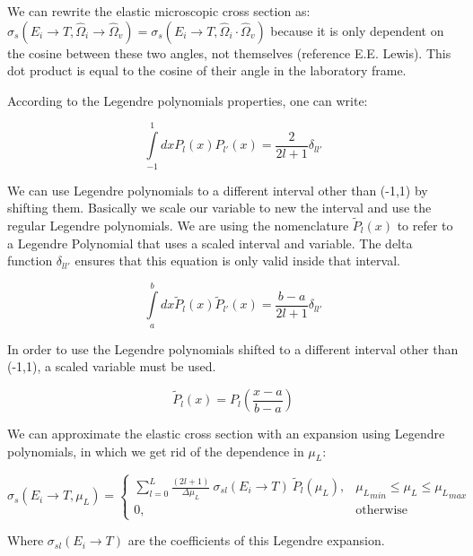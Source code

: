 \documentclass[review]{elsarticle}
\begin{document}
We can rewrite the elastic microscopic cross section as: $\sigma_{s}(E_i \rightarrow T, \hat{\Omega}_i \rightarrow \hat{\Omega}_v) = \sigma_{s}(E_i \rightarrow T, \hat{\Omega}_i \cdot \hat{\Omega}_v)$ because it is only dependent on the cosine between these two angles, not themselves (reference E.E. Lewis). This dot product is equal to the cosine of their angle in the laboratory frame. 

According to the Legendre polynomials properties, one can write:

\begin{equation}
	\int\limits_{-1}^1 dx P_l(x) P_{l'}(x) = \frac{2}{2l +1} \delta_{ll'}
\end{equation}

We can use Legendre polynomials to a different interval other than (-1,1) by shifting them. Basically we scale our variable to new the interval and use the regular Legendre polynomials. We are using the nomenclature $\tilde P_l(x)$ to refer to a Legendre Polynomial that uses a scaled interval and variable. The delta function $\delta_{ll'}$ ensures that this equation is only valid inside that interval.

\begin{equation}
	\int\limits_{a}^{b} dx \tilde P_l(x) \tilde P_{l'}(x) = \frac{b - a}{2l +1} \delta_{ll'}
\end{equation}

In order to use the Legendre polynomials shifted to a different interval other than (-1,1), a scaled variable must be used. 

\begin{equation}
	\tilde P_l (x) = P_l \left( \frac{x - a}{b - a}\right)
\end{equation}

We can approximate the elastic cross section with an expansion using Legendre polynomials, in which we get rid of the dependence in $\mu_L$:

\begin{equation}
	\sigma_{s}(E_i \rightarrow T, \mu_L) = 
	\begin{cases}
    		\sum\limits_{l=0}^{L} \frac{(2l +1)}{\Delta \mu_L} \  \sigma_{sl} (E_i \rightarrow T) \ \tilde P_l (\mu_L), & {\mu_L}_{min} \leq {\mu_L} \leq {\mu_L}_{max} \\
    		0,              & \text{otherwise}
\end{cases}
\label{eq:xs_expansion}
\end{equation}

Where $\sigma_{sl} (E_i \rightarrow T)$ are the coefficients of this Legendre expansion.
\end{document}
